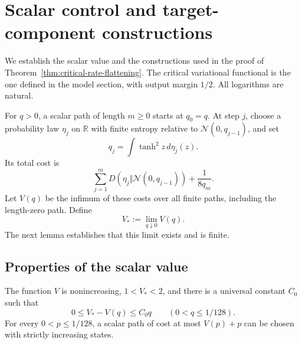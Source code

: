 \section{Scalar control and target-component constructions}
\label{sec:critical-rate-foundations}
\label{sec:critical-rate-flattening}

We establish the scalar value and the constructions used in the proof
of Theorem~\ref{thm:critical-rate-flattening}. The critical variational
functional is the one defined in the model section, with output margin
$1/2$. All logarithms are natural.

\begin{definition}
\label{def:critical-scalar-value}
For $q>0$, a scalar path of length $m\ge0$ starts at $q_0=q$.
At step $j$, choose a probability law $\eta_j$ on $\mathbb R$ with
finite entropy relative to $\mathcal N(0,q_{j-1})$, and set
\[
 q_j=\int\tanh^2 z\,d\eta_j(z).
\]
Its total cost is
\[
 \sum_{j=1}^{m}D(\eta_j\Vert\mathcal N(0,q_{j-1}))
       +\frac1{8q_m}.
\]
Let $V(q)$ be the infimum of these costs over all finite paths, including
the length-zero path. Define
\[
 V_*:=\lim_{q\downarrow0}V(q).
\]
The next lemma establishes that this limit exists and is finite.
\end{definition}

\subsection{Properties of the scalar value}

\begin{lemma}
\label{lem:scalar-value-properties}
The function $V$ is nonincreasing, $1<V_*<2$, and there is a
universal constant $C_0$ such that
\[
 0\le V_*-V(q)\le C_0q\qquad(0<q\le1/128).
\]
For every $0<p\le1/128$, a scalar path of cost at most $V(p)+p$ can
be chosen with strictly increasing states.
\end{lemma}

